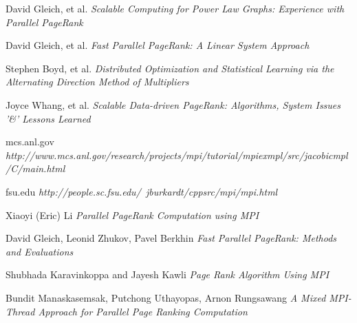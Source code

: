 \documentclass[a4paper,10pt]{article}
\begin{document}
\begin{thebibliography}{1}

 David Gleich, et al. {\em Scalable Computing for Power Law Graphs: Experience with Parallel PageRank}

 David Gleich, et al. {\em Fast Parallel PageRank: A Linear System Approach} 

 Stephen Boyd, et al. {\em Distributed Optimization and Statistical Learning via the Alternating Direction Method of Multipliers} 

 Joyce Whang, et al. {\em Scalable Data-driven PageRank: Algorithms, System Issues '\&' Lessons Learned}
 
  mcs.anl.gov {\em http://www.mcs.anl.gov/research/projects/mpi/tutorial/mpiexmpl/src/jacobicmpl/C/main.html}
 
  fsu.edu {\em http://people.sc.fsu.edu/~jburkardt/cppsrc/mpi/mpi.html}

  Xiaoyi (Eric) Li  {\em Parallel PageRank Computation using MPI}

  David Gleich, Leonid Zhukov, Pavel Berkhin  {\em Fast Parallel PageRank: Methods and Evaluations}

  Shubhada Karavinkoppa and Jayesh Kawli  {\em Page Rank Algorithm Using MPI}

  Bundit Manaskasemsak, Putchong Uthayopas, Arnon Rungsawang {\em A Mixed MPI-Thread Approach for Parallel Page Ranking Computation}

\end{thebibliography}
\end{document}
